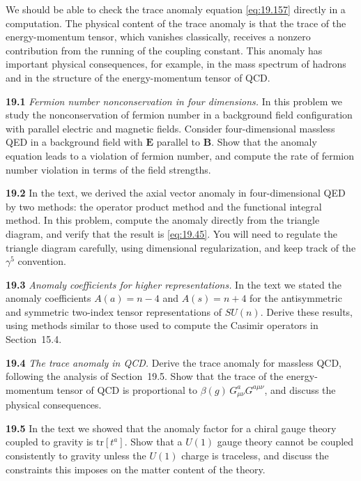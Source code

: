 We should be able to check the trace anomaly equation \eqref{eq:19.157}
directly in a computation.  The physical content of the trace anomaly is that
the trace of the energy-momentum tensor, which vanishes classically, receives
a nonzero contribution from the running of the coupling constant.  This
anomaly has important physical consequences, for example, in the mass
spectrum of hadrons and in the structure of the energy-momentum tensor of
QCD.

\problems

\textbf{19.1} \emph{Fermion number nonconservation in four dimensions.}  In
this problem we study the nonconservation of fermion number in a background
field configuration with parallel electric and magnetic fields.  Consider
four-dimensional massless QED in a background field with $\mathbf{E}$ parallel
to $\mathbf{B}$.  Show that the anomaly equation leads to a violation of
fermion number, and compute the rate of fermion number violation in terms of
the field strengths.

\textbf{19.2} In the text, we derived the axial vector anomaly in
four-dimensional QED by two methods: the operator product method and the
functional integral method.  In this problem, compute the anomaly directly
from the triangle diagram, and verify that the result is
\eqref{eq:19.45}.  You will need to regulate the triangle diagram carefully,
using dimensional regularization, and keep track of the $\gamma^5$
convention.

\textbf{19.3} \emph{Anomaly coefficients for higher representations.}  In the
text we stated the anomaly coefficients $A(a) = n-4$ and $A(s) = n+4$ for
the antisymmetric and symmetric two-index tensor representations of
$SU(n)$.  Derive these results, using methods similar to those used to
compute the Casimir operators in Section~15.4.

\textbf{19.4} \emph{The trace anomaly in QCD.}  Derive the trace anomaly for
massless QCD, following the analysis of Section~19.5.  Show that the trace of
the energy-momentum tensor of QCD is proportional to
$\beta(g)\,G^a_{\mu\nu}G^{a\mu\nu}$, and discuss the physical consequences.

\textbf{19.5} In the text we showed that the anomaly factor for a chiral
gauge theory coupled to gravity is $\mathrm{tr}[t^a]$.  Show that a $U(1)$
gauge theory cannot be coupled consistently to gravity unless the $U(1)$
charge is traceless, and discuss the constraints this imposes on the matter
content of the theory.
